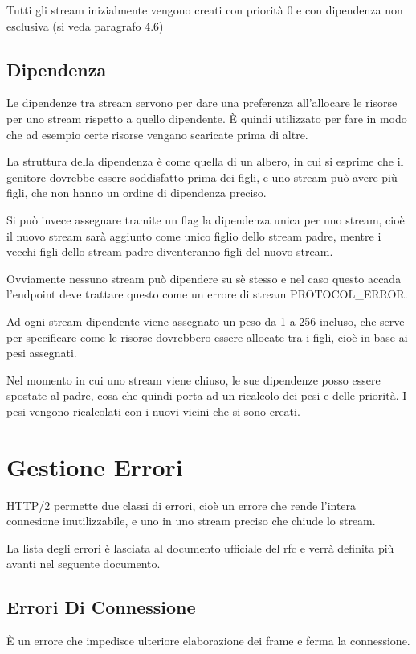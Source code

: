 \documentclass[12pt, a4paper]{article} %
\begin{document}
Tutti gli stream inizialmente vengono creati con priorità 0 e con dipendenza non esclusiva (si veda paragrafo 4.6)

\subsection{Dipendenza}
Le dipendenze tra stream servono per dare una preferenza all'allocare le risorse per uno stream rispetto a quello dipendente.
\uppercase{è} quindi utilizzato per fare in modo che ad esempio certe risorse vengano scaricate prima di altre.

La struttura della dipendenza è come quella di un albero, in cui si esprime che il genitore dovrebbe essere soddisfatto prima dei figli, e uno stream può avere più figli, che non hanno un ordine di dipendenza preciso.

Si può invece assegnare tramite un flag la dipendenza unica per uno stream, cioè il nuovo stream sarà aggiunto come unico figlio dello stream padre, mentre i vecchi figli dello stream padre diventeranno figli del nuovo stream.

Ovviamente nessuno stream può dipendere su sè stesso e nel caso questo accada l'endpoint deve trattare questo come un errore di stream PROTOCOL\_ERROR.

Ad ogni stream dipendente viene assegnato un peso da 1 a 256 incluso, che serve per specificare come le risorse dovrebbero essere allocate tra i figli, cioè in base ai pesi assegnati.

Nel momento in cui uno stream viene chiuso, le sue dipendenze posso essere spostate al padre, cosa che quindi porta ad un ricalcolo dei pesi e delle priorità. I pesi vengono ricalcolati con i nuovi vicini che si sono creati.

\section{Gestione Errori}
HTTP/2 permette due classi di errori, cioè un errore che rende l'intera connesione inutilizzabile, e uno in uno stream preciso che chiude lo stream.

La lista degli errori è lasciata al documento ufficiale del rfc e verrà definita più avanti nel seguente documento.

\subsection{Errori Di Connessione}
\uppercase{è} un errore che impedisce ulteriore elaborazione dei frame e ferma la connessione.
\end{document}

